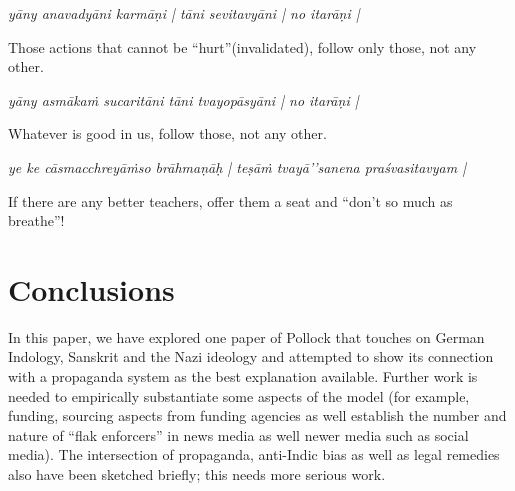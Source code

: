 \begin{myquote}
{\sl yāny anavadyāni karmāṇi | tāni sevitavyāni | no itarāṇi |}

{\rm Those actions that cannot be “hurt”(invalidated), follow only those, not any other.}

{\sl yāny asmākaṁ sucaritāni tāni tvayopāsyāni | no itarāṇi |}

{\rm Whatever is good in us, follow those, not any other.}

{\sl ye ke cāsmacchreyāṁso brāhmaṇāḥ | teṣāṁ tvayā’’sanena praśvasitavyam |}

{\rm If there are any better teachers, offer them a seat and “don't so much as breathe”!}
\end{myquote}
\vskip -20pt

\section*{Conclusions}

In this paper, we have explored one paper of Pollock that touches on German Indology, Sanskrit and the Nazi ideology and attempted to show its connection with a propaganda system as the best explanation available. Further work is needed to empirically substantiate some aspects of the model (for example, funding, sourcing aspects from funding agencies as well establish the number and nature of “flak enforcers” in news media as well newer media such as social media). The intersection of propaganda, anti-Indic bias as well as legal remedies also have been sketched briefly; this needs more serious work.


